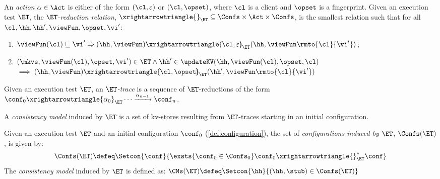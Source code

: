 \begin{definition}[$\ET$-trace]
\label{def:reduction}
An \emph{action} $\alpha \in \Act$ is either of the form $(\cl, \varepsilon)$ or $(\cl, \opset)$, 
where $\cl$ is a client and $\opset$ is a fingerprint. 
Given an execution test $\ET$, the $\ET$-\emph{reduction relation},
$\xrightarrowtriangle{}_{\ET} \subseteq \Confs \times \Act \times \Confs$, 
is the smallest relation such that for all $\cl, \hh, \hh', \viewFun, \opset, \vi'$:
\begin{enumerate}
	\item
    $\viewFun(\cl) \sqsubseteq \vi'
    \Rightarrow
    (\hh, \viewFun) \xrightarrowtriangle{\hspace{-5pt}(\cl, \varepsilon)\hspace{-5pt}}_{\ET} 
    (\hh, \viewFun\rmto{\cl}{\vi'})$; 
	\item 
    $(\mkvs, \viewFun(\cl), \opset, \vi') \in \ET
        \wedge \hh' \in \updateKV(\hh, \viewFun(\cl) , \opset, \cl)
	$  \\
	\phantom{a} \hfill $\implies (\hh, \viewFun) \xrightarrowtriangle{\hspace{-5pt}(\cl, \opset)\hspace{-5pt}}_{\ET} (\hh', \viewFun\rmto{\cl}{\vi'})$
\end{enumerate}
Given an execution test $\ET$, an \emph{$\ET$-trace} is a sequence of $\ET$-reductions of the form $\conf_{0} \xrightarrowtriangle{\alpha_{0}}_{\ET} \cdots 
\xrightarrow{\alpha_{n-1}} \conf_{n}$.
\end{definition}




A \emph{consistency model} induced by $\ET$ is a set of kv-stores
resulting from $\ET$-traces starting in an 
initial configuration. 

\begin{definition}
\label{def:cm}
Given an execution test $\ET$ and an initial configuration $\conf_0$ (\cref{def:configuration}),
the set of \emph{configurations induced by $\ET$},  $\Confs(\ET)$, is   given by: 
\[
\Confs(\ET)\defeq 
\Setcon{ \conf}{ 
	\exsts{\conf_0 \in \Confs_0}
	\conf_0 \xrightarrowtriangle{}_{\ET}^{*} \conf
}
\]
The \emph{consistency model} induced by $\ET$ is defined as:
\( 
\CMs(\ET) \defeq \Setcon{ \hh }{ (\hh, \stub) \in \Confs(\ET) }
\)
\end{definition}


